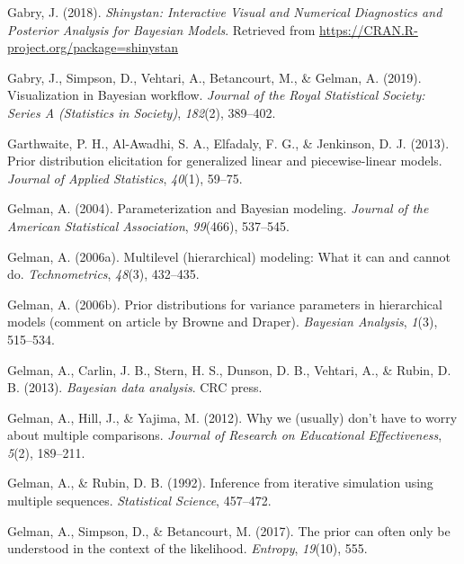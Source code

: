 \documentclass[openright,titlepage,12pt,a4paper]{book}
\begin{document}
\leavevmode\hypertarget{ref-gabry_shinystan:_2018}{}%
Gabry, J. (2018). \emph{Shinystan: Interactive Visual and Numerical Diagnostics and Posterior Analysis for Bayesian Models}. Retrieved from \url{https://CRAN.R-project.org/package=shinystan}

\leavevmode\hypertarget{ref-gabry_visualization_2019}{}%
Gabry, J., Simpson, D., Vehtari, A., Betancourt, M., \& Gelman, A. (2019). Visualization in Bayesian workflow. \emph{Journal of the Royal Statistical Society: Series A (Statistics in Society)}, \emph{182}(2), 389--402.

\leavevmode\hypertarget{ref-garthwaite_prior_2013}{}%
Garthwaite, P. H., Al-Awadhi, S. A., Elfadaly, F. G., \& Jenkinson, D. J. (2013). Prior distribution elicitation for generalized linear and piecewise-linear models. \emph{Journal of Applied Statistics}, \emph{40}(1), 59--75.

\leavevmode\hypertarget{ref-gelman_parameterization_2004}{}%
Gelman, A. (2004). Parameterization and Bayesian modeling. \emph{Journal of the American Statistical Association}, \emph{99}(466), 537--545.

\leavevmode\hypertarget{ref-gelman_multilevel_2006}{}%
Gelman, A. (2006a). Multilevel (hierarchical) modeling: What it can and cannot do. \emph{Technometrics}, \emph{48}(3), 432--435.

\leavevmode\hypertarget{ref-gelman_prior_2006}{}%
Gelman, A. (2006b). Prior distributions for variance parameters in hierarchical models (comment on article by Browne and Draper). \emph{Bayesian Analysis}, \emph{1}(3), 515--534.

\leavevmode\hypertarget{ref-gelman_bayesian_2013}{}%
Gelman, A., Carlin, J. B., Stern, H. S., Dunson, D. B., Vehtari, A., \& Rubin, D. B. (2013). \emph{Bayesian data analysis}. CRC press.

\leavevmode\hypertarget{ref-gelman_why_2012}{}%
Gelman, A., Hill, J., \& Yajima, M. (2012). Why we (usually) don't have to worry about multiple comparisons. \emph{Journal of Research on Educational Effectiveness}, \emph{5}(2), 189--211.

\leavevmode\hypertarget{ref-gelman_inference_1992}{}%
Gelman, A., \& Rubin, D. B. (1992). Inference from iterative simulation using multiple sequences. \emph{Statistical Science}, 457--472.

\leavevmode\hypertarget{ref-gelman_prior_2017}{}%
Gelman, A., Simpson, D., \& Betancourt, M. (2017). The prior can often only be understood in the context of the likelihood. \emph{Entropy}, \emph{19}(10), 555.
\end{document}
